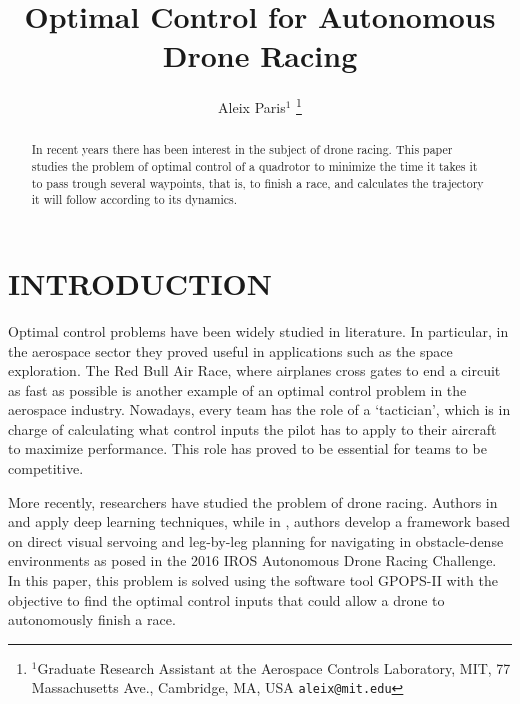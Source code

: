 \documentclass[letterpaper, 10 pt, conference]{ieeeconf}  %
\title{\LARGE \bf
Optimal Control for Autonomous Drone Racing
}
\author{Aleix Paris$^{1}$%
\thanks{$^{1}$Graduate Research Assistant at the Aerospace Controls Laboratory,
        MIT, 77 Massachusetts Ave., Cambridge, MA, USA
        {\tt\small aleix@mit.edu}}%
}
\begin{document}
\maketitle
\thispagestyle{empty}
\pagestyle{empty}



\begin{abstract}

In recent years there has been interest in the subject of drone racing. This paper studies the problem of optimal control of a quadrotor to minimize the time it takes it to pass trough several waypoints, that is, to finish a race, and calculates the trajectory it will follow according to its dynamics.

\end{abstract}


\section{INTRODUCTION}\label{s:intro}

Optimal control problems have been widely studied in literature. In particular, in the aerospace sector they proved useful in applications such as the space exploration. The Red Bull Air Race, where airplanes cross gates to end a circuit as fast as possible is another example of an optimal control problem in the aerospace industry. Nowadays, every team has the role of a `tactician', which is in charge of calculating what control inputs the pilot has to apply to their aircraft to maximize performance. This role has proved to be essential for teams to be competitive.

More recently, researchers have studied the problem of drone racing. Authors in \cite{jung2018perception} and \cite{kaufmann2018deep} apply deep learning techniques, while in \cite{jung2018direct}, authors develop a framework based on direct visual servoing and leg-by-leg planning for navigating in obstacle-dense environments as posed in the 2016 IROS Autonomous Drone Racing Challenge. In this paper, this problem is solved using the software tool GPOPS-II \cite{patterson2014gpops} with the objective to find the optimal control inputs that could allow a drone to autonomously finish a race.
\end{document}
